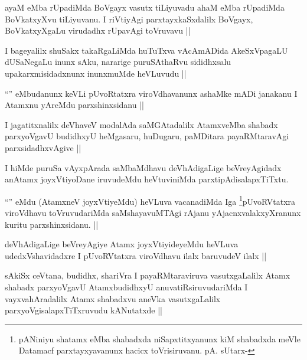\begin{artha}
ayaM eMba rUpadiMda BoVgayx vasutx tiLiyuvadu ahaM eMba rUpadiMda BoVkatxyXvu tiLiyuvanu. I riVtiyAgi parxtayxkaSxdalilx BoVgayx, BoVkatxyXgaLu virudadhx rUpavAgi toVruvavu ||
\end{artha}

\begin{artha}
I bageyalilx shuSakx takaRgaLiMda huTuTxva vAcAmADida AkeSxVpagaLU dUSaNegaLu inunx sAku, nararige puruSAthaRvu sididhxsalu upakarxmisidadxnunx inunxmuMde heVLuvudu ||
\end{artha}

\begin{artha}
``\stext'' eMbudanunx keVLi pUvoRtatxra viroVdhavanunx ashaMke mADi janakanu I Atamxnu yAreMdu parxshinxsidanu ||
\end{artha}

\begin{artha}
I jagatitxnalilx deVhaveV modalAda saMGAtadalilx AtamxveMba shabadx parxyoVgavU budidhxyU heMgasaru, huDugaru, paMDitara payaRMtaravAgi parxsidadhxvAgive ||
\end{artha}

\begin{artha}
I hiMde puruSa vAyxpArada saMbaMdhavu deVhAdigaLige beVreyAgidadx anAtamx joyxVtiyoDane iruvudeMdu  heVtuviniMda parxtipAdisalapxTiTxtu.
\end{artha}

\begin{artha}
``\stext'' eMdu (AtamxneV joyxVtiyeMdu) heVLuva vacanadiMda Iga \footnote{pANiniyu shatamx eMba shabadxda niSapxtitxyanunx kiM shabadxda meVle Datamacf parxtayxyavanunx hacicx toVrisiruvanu. pA. sUtarx-}pUvoRVtatxra viroVdhavu toVruvudariMda saMshayavuMTAgi rAjanu yAjacnxvalakxyXranunx kuritu parxshinxsidanu. || 
\end{artha}

\begin{artha}
deVhAdigaLige beVreyAgiye Atamx joyxVtiyideyeMdu heVLuva udedxVshavidadxre I pUvoRVtatxra viroVdhavu ilalx baruvudeV ilalx ||
\end{artha}

\begin{artha}
sAkiSx ceVtana, budidhx, shariVra I payaRMtaraviruva vasutxgaLalilx Atamx shabadx parxyoVgavU AtamxbudidhxyU anuvatiRsiruvudariMda I vayxvahAradalilx Atamx shabadxvu aneVka vasutxgaLalilx parxyoVgisalapxTiTxruvudu kANutatxde ||
\end{artha}

